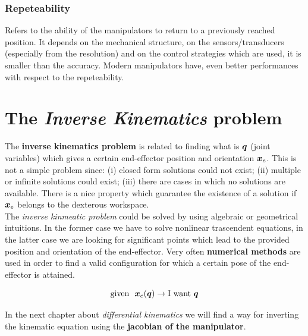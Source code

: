 \subsubsection{Repeteability}
Refers to the ability of the manipulators to return to a previously reached position. It depends on the mechanical structure, on the sensors/transducers (especially from the resolution) and on the control strategies which are used, it is smaller than the accuracy. 
Modern manipulators have, even better performances with respect to the repeteability.

\section{The \textit{Inverse Kinematics} problem} 
The \textbf{inverse kinematics problem} is related to finding what is $\boldsymbol{q}$ (joint variables) which gives a certain end-effector position and orientation $\boldsymbol{x}_e$. This is not a simple problem since: (i) closed form solutions could not exist; (ii) multiple or infinite solutions could exist; (iii) there are cases in which no solutions are available. There is a nice property which guarantee the existence of a solution if $\boldsymbol{x}_e$ belongs to the dexterous workspace. \\
The \textit{inverse kinmeatic problem} could be solved by using algebraic or geometrical intuitions. In the former case we have to solve nonlinear trascendent equations, in the latter case we are looking for significant points which lead to the provided position and orientation of the end-effector. Very often \textbf{numerical methods} are used in order to find a valid configuration for which a certain pose of the end-effector is attained. 

{\Large
\begin{equation}
    \text{given } \ \boldsymbol{x}_e(\boldsymbol{q}) \to \text{I want } \boldsymbol{q} 
\end{equation}
}

In the next chapter about \textit{differential kinematics} we will find a way for inverting the kinematic equation using the \textbf{jacobian of the manipulator}.

